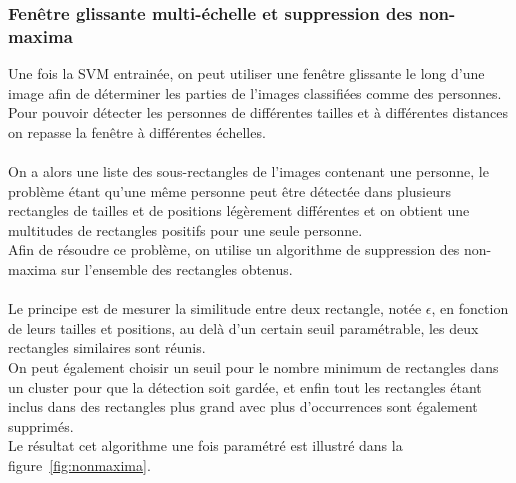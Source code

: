 \documentclass[12pt]{article}
\begin{document}
\subsubsection{Fenêtre glissante multi-échelle et suppression des non-maxima}
Une fois la SVM entrainée, on peut utiliser une fenêtre glissante le long d'une image afin de déterminer les parties de l'images classifiées comme des personnes. Pour pouvoir détecter les personnes de différentes tailles et à différentes distances on repasse la fenêtre à différentes échelles.\\
\\
On a alors une liste des sous-rectangles de l'images contenant une personne, le problème étant qu'une même personne peut être détectée dans plusieurs rectangles de tailles et de positions légèrement différentes et on obtient une multitudes de rectangles positifs pour une seule personne.\\
Afin de résoudre ce problème, on utilise un algorithme de suppression des non-maxima sur l'ensemble des rectangles obtenus.\\\\
Le principe est de mesurer la similitude entre deux rectangle, notée $\epsilon$, en fonction de leurs tailles et positions, au delà d'un certain seuil paramétrable, les deux rectangles similaires sont réunis.\\
On peut également choisir un seuil pour le nombre minimum de rectangles dans un cluster pour que la détection soit gardée, et enfin tout les rectangles étant inclus dans des rectangles plus grand avec plus d’occurrences sont également supprimés.\\
Le résultat cet algorithme une fois paramétré est illustré dans la figure~\ref{fig:nonmaxima}.
\end{document}

